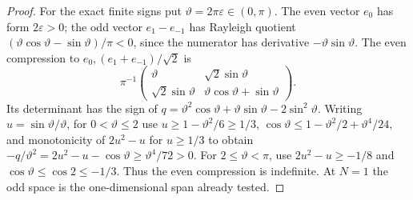 \begin{proof}
For the exact finite signs put $\vartheta=2\pi\varepsilon\in(0,\pi)$.
The even vector $e_0$ has form $2\varepsilon>0$; the odd vector
$e_1-e_{-1}$ has Rayleigh quotient
$(\vartheta\cos\vartheta-\sin\vartheta)/\pi<0$, since the numerator
has derivative $-\vartheta\sin\vartheta$.
The even compression to $e_0,(e_1+e_{-1})/\sqrt2$ is
\[
\pi^{-1}\begin{pmatrix}\vartheta&\sqrt2\sin\vartheta\\
\sqrt2\sin\vartheta&\vartheta\cos\vartheta+\sin\vartheta\end{pmatrix}.
\]
Its determinant has the sign of
$q=\vartheta^2\cos\vartheta+\vartheta\sin\vartheta-2\sin^2\vartheta$.
Writing $u=\sin\vartheta/\vartheta$, for $0<\vartheta\le2$ use
$u\ge1-\vartheta^2/6\ge1/3$,
$\cos\vartheta\le1-\vartheta^2/2+\vartheta^4/24$, and monotonicity
of $2u^2-u$ for $u\ge1/3$ to obtain
$-q/\vartheta^2=2u^2-u-\cos\vartheta\ge\vartheta^4/72>0$.
For $2\le\vartheta<\pi$, use $2u^2-u\ge-1/8$ and
$\cos\vartheta\le\cos2\le-1/3$. Thus the even compression is
indefinite. At $N=1$ the odd space is the one-dimensional span already tested.
\end{proof}

